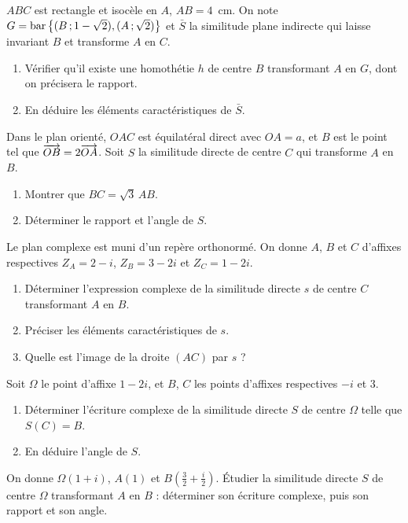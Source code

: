 \begin{annales}
$ABC$ est rectangle et isocèle en $A$, $AB = 4$~cm. On note
$G = \operatorname{bar}\left\{(B\,;1-\sqrt2),(A\,;\sqrt2)\right\}$ et $\bar S$ la similitude plane
indirecte qui laisse invariant $B$ et transforme $A$ en $C$.
\begin{enumerate}[label=\textbf{\alph*)}, leftmargin=*, itemsep=0.15em]
  \item Vérifier qu'il existe une homothétie $h$ de centre $B$ transformant
        $A$ en $G$, dont on précisera le rapport.
  \item En déduire les éléments caractéristiques de $\bar S$.
\end{enumerate}

Dans le plan orienté, $OAC$ est équilatéral direct avec $OA = a$, et $B$ est
le point tel que $\overrightarrow{OB} = 2\overrightarrow{OA}$. Soit $S$ la similitude directe de
centre $C$ qui transforme $A$ en $B$.
\begin{enumerate}[label=\textbf{\alph*)}, leftmargin=*, itemsep=0.15em]
  \item Montrer que $BC = \sqrt3\,AB$.
  \item Déterminer le rapport et l'angle de $S$.
\end{enumerate}

Le plan complexe est muni d'un repère orthonormé. On donne $A$, $B$ et $C$
d'affixes respectives $Z_{A} = 2-i$, $Z_{B} = 3-2i$ et $Z_{C} = 1-2i$.
\begin{enumerate}[label=\textbf{\alph*)}, leftmargin=*, itemsep=0.15em]
  \item Déterminer l'expression complexe de la similitude directe $s$ de
        centre $C$ transformant $A$ en $B$.
  \item Préciser les éléments caractéristiques de $s$.
  \item Quelle est l'image de la droite $(AC)$ par $s$ ?
\end{enumerate}

Soit $\Omega$ le point d'affixe $1-2i$, et $B$, $C$ les points d'affixes
respectives $-i$ et $3$.
\begin{enumerate}[label=\textbf{\alph*)}, leftmargin=*, itemsep=0.15em]
  \item Déterminer l'écriture complexe de la similitude directe $S$ de centre
        $\Omega$ telle que $S(C) = B$.
  \item En déduire l'angle de $S$.
\end{enumerate}

On donne $\Omega(1+i)$, $A(1)$ et $B\!\left(\frac32+\frac i2\right)$. Étudier
la similitude directe $S$ de centre $\Omega$ transformant $A$ en $B$ :
déterminer son écriture complexe, puis son rapport et son angle.
\end{annales}

